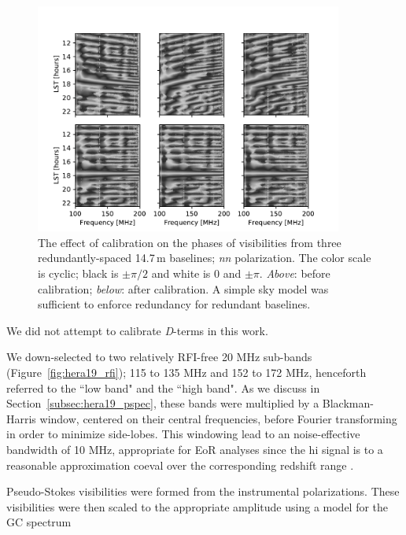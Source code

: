 \begin{figure}
\centering
\includegraphics[width=0.9\textwidth]{chapters/eor_window_HERA/figures/phases_pre_post_abscal_h19_cyclic_grey.pdf}
\caption[The effect of calibration on the phases of visibilities from three redundantly-spaced 14.7\,m baselines.]{The effect of calibration on the phases of visibilities from three redundantly-spaced 14.7\,m baselines; \textit{nn} polarization. The color scale is cyclic; black is $\pm\pi/2$ and white is 0 and $\pm\pi$. \textit{Above}: before calibration; \textit{below}: after calibration. A simple sky model was sufficient to enforce redundancy for redundant baselines.}
\label{fig:hera19_phasecal}
\end{figure}

We did not attempt to calibrate \textit{D}-terms in this work.

We down-selected to two relatively RFI-free 20 MHz sub-bands (Figure~\ref{fig:hera19_rfi}); 115 to 135 MHz and 152 to 172 MHz, henceforth referred to the ``low band" and the ``high band". As we discuss in Section~\ref{subsec:hera19_pspec}, these bands were multiplied by a Blackman-Harris window, centered on their central frequencies, before Fourier transforming in order to minimize side-lobes. This windowing lead to an noise-effective bandwidth of 10 MHz, appropriate for EoR analyses since the {\sc hi} signal is to a reasonable approximation coeval over the corresponding redshift range \citep{Furlanetto.06}.

Pseudo-Stokes visibilities were formed from the instrumental polarizations. These visibilities were then scaled to the appropriate amplitude using a model for the GC spectrum 

